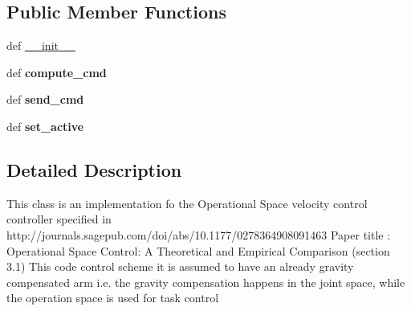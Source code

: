 \subsection*{Public Member Functions}
\begin{DoxyCompactItemize}
\item 
def \hyperlink{classaml__ctrl_1_1controllers_1_1os__controllers_1_1os__torque__controller_1_1_o_s_torque_controller_ac1608a2c52270e0612e0c86bf7d1c205}{\-\_\-\-\_\-init\-\_\-\-\_\-}
\item 
\hypertarget{classaml__ctrl_1_1controllers_1_1os__controllers_1_1os__torque__controller_1_1_o_s_torque_controller_ade8dd018b7bb2e5106b154b36948d8d1}{def {\bfseries compute\-\_\-cmd}}\label{classaml__ctrl_1_1controllers_1_1os__controllers_1_1os__torque__controller_1_1_o_s_torque_controller_ade8dd018b7bb2e5106b154b36948d8d1}

\item 
\hypertarget{classaml__ctrl_1_1controllers_1_1os__controllers_1_1os__torque__controller_1_1_o_s_torque_controller_a31d3e8ae8563a5f31b173d87eafaa996}{def {\bfseries send\-\_\-cmd}}\label{classaml__ctrl_1_1controllers_1_1os__controllers_1_1os__torque__controller_1_1_o_s_torque_controller_a31d3e8ae8563a5f31b173d87eafaa996}

\item 
\hypertarget{classaml__ctrl_1_1controllers_1_1os__controllers_1_1os__torque__controller_1_1_o_s_torque_controller_a73b83e3fd7cfaead53fa8287766f7d61}{def {\bfseries set\-\_\-active}}\label{classaml__ctrl_1_1controllers_1_1os__controllers_1_1os__torque__controller_1_1_o_s_torque_controller_a73b83e3fd7cfaead53fa8287766f7d61}

\end{DoxyCompactItemize}


\subsection{Detailed Description}
\begin{DoxyVerb}This class is an implementation fo the Operational Space velocity control 
controller specified in http://journals.sagepub.com/doi/abs/10.1177/0278364908091463
Paper title : Operational Space Control: A Theoretical and Empirical Comparison (section 3.1)
This code control scheme it is assumed to have an already gravity compensated arm
i.e. the gravity compensation happens in the joint space, while the operation space is used for task control
\end{DoxyVerb}
 

